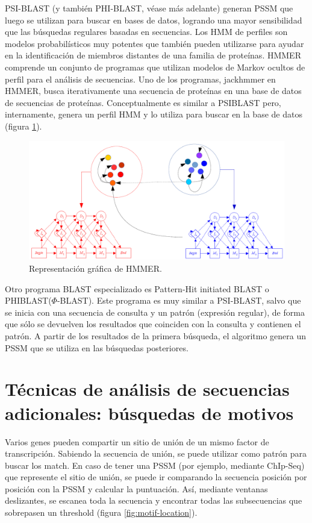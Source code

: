 PSI-BLAST (y también PHI-BLAST, véase más adelante) generan PSSM que luego se utilizan para buscar en bases de datos, logrando una mayor sensibilidad que las búsquedas regulares basadas en secuencias. Los HMM de perfiles son modelos probabilísticos muy potentes que también pueden utilizarse para ayudar en la identificación de miembros distantes de una familia de proteínas. HMMER comprende un conjunto de programas que utilizan modelos de Markov ocultos de perfil para el análisis de secuencias. Uno de los programas, jackhmmer en HMMER, busca iterativamente una secuencia de proteínas en una base de datos de secuencias de proteínas. Conceptualmente es similar a PSIBLAST pero, internamente, genera un perfil HMM y lo utiliza para buscar en la base de datos (figura \ref{fig:hmmer}).

\begin{figure}[htbp]
\centering
\includegraphics[width = \textwidth]{figs/hmmer.png}
\caption{Representación gráfica de HMMER.}
\label{fig:hmmer}
\end{figure}

Otro programa BLAST especializado es Pattern-Hit initiated BLAST o PHIBLAST($\Phi$-BLAST). Este programa es muy similar a PSI-BLAST, salvo que se inicia con una secuencia de consulta y un patrón (expresión regular), de forma que sólo se devuelven los resultados que coinciden con la consulta y contienen el patrón. A partir de los resultados de la primera búsqueda, el algoritmo genera un PSSM que se utiliza en las búsquedas posteriores.

\section{Técnicas de análisis de secuencias adicionales: búsquedas de motivos}
Varios genes pueden compartir un sitio de unión de un mismo factor de transcripción. Sabiendo la secuencia de unión, se puede utilizar como patrón para buscar los match. En caso de tener una PSSM (por ejemplo, mediante ChIp-Seq) que represente el sitio de unión, se puede ir comparando la secuencia posición por posición con la PSSM y calcular la puntuación. Así, mediante ventanas deslizantes, se escanea toda la secuencia y encontrar todas las subsecuencias que sobrepasen un threshold (figura \ref{fig:motif-location}). 

